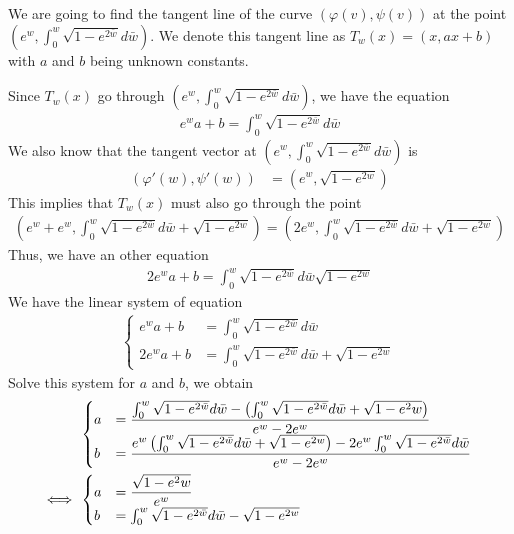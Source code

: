 \documentclass[a4paper]{report}
\begin{document}
We are going to find the tangent line of the curve $(\varphi(v), \psi(v))$ at the point $\left(e^w, \int_{0}^{w} \sqrt{1 - e^{2\bar{w} }}d\bar{w} \right)$. We denote this tangent line as $T_w(x) = (x,ax + b)$ with $a$ and $b$ being unknown constants.

Since $T_w(x)$ go through $\left(e^w, \int_{0}^{w} \sqrt{1 - e^{2\bar{w} }}d\bar{w} \right)$, we have the equation
\begin{align}
	e^w a  + b = \int_{0}^{w} \sqrt{1 - e^{2\bar{w} }}d\bar{w} \label{7e_t1}
\end{align}
We also know that the tangent vector at $\left(e^w, \int_{0}^{w} \sqrt{1 - e^{2\bar{w} }}d\bar{w} \right)$ is
\begin{align}
	(\varphi'(w), \psi'(w)) &= \left(e^{w},  \sqrt{1 - e^{2w }}\right)
\end{align}
This implies that $T_w(x)$ must also go through the point
\begin{align}
	\left(e^w + e^{w}, \int_{0}^{w} \sqrt{1 - e^{2\bar{w} }}d\bar{w} + \sqrt{1 - e^{2w }} \right)  = \left(2e^w, \int_{0}^{w} \sqrt{1 - e^{2\bar{w} }}d\bar{w} + \sqrt{1 - e^{2w }} \right)
\end{align}
Thus, we have an other equation
\begin{align}
2 e^w a  + b = \int_{0}^{w} \sqrt{1 - e^{2\bar{w} }}d\bar{w} \sqrt{1 - e^{2w }}  \label{7e_t2}
\end{align}
We have the linear system of equation
\begin{align}
\begin{cases}
e^w a  + b &= \int_{0}^{w} \sqrt{1 - e^{2\bar{w} }}d\bar{w}\\
2 e^w a  + b &= \int_{0}^{w} \sqrt{1 - e^{2\bar{w} }}d\bar{w} + \sqrt{1 - e^{2w }} 
\end{cases}
\end{align}
Solve this system for $a$ and $b$, we obtain
\begin{align}
	&\begin{cases}
	a &= \dfrac{\int_{0}^{w} \sqrt{1 - e^{2\bar{w} }}d\bar{w} - \left(\int_{0}^{w} \sqrt{1 - e^{2\bar{w} }}d\bar{w} + \sqrt{1 - e^2w }\right)}{e^w - 2e^w}\\
	b &= \dfrac{e^w\left(\int_{0}^{w} \sqrt{1 - e^{2\bar{w} }}d\bar{w} + \sqrt{1 - e^{2w }}\right) - 2e^w\int_{0}^{w} \sqrt{1 - e^{2\bar{w} }}d\bar{w}}{e^w - 2e^w}
	\end{cases}\\
	\Longleftrightarrow\enskip&
	\begin{cases}
	a &= \dfrac{\sqrt{1 - e^2w }}{e^w}\\
	b &= \int_{0}^{w} \sqrt{1 - e^{2\bar{w} }}d\bar{w} - \sqrt{1 - e^{2w }}
	\end{cases}
\end{align}
\end{document}
